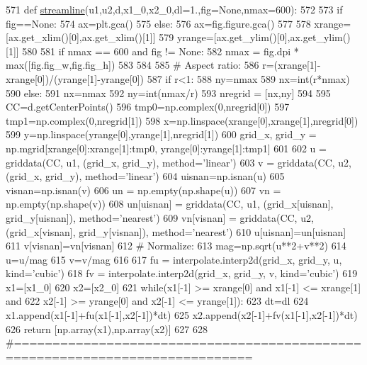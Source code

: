 \begin{DoxyCode}
571 \textcolor{keyword}{def }\hyperlink{namespaceamrplot_a214eccffe1d56a25d80925cc453f5a23}{streamline}(u1,u2,d,x1\_0,x2\_0,dl=1.,fig=None,nmax=600):
572 
573     \textcolor{keywordflow}{if} fig==\textcolor{keywordtype}{None}:
574         ax=plt.gca()
575     \textcolor{keywordflow}{else}:
576         ax=fig.figure.gca()
577 
578     xrange=[ax.get\_xlim()[0],ax.get\_xlim()[1]]
579     yrange=[ax.get\_ylim()[0],ax.get\_ylim()[1]]
580 
581     \textcolor{keywordflow}{if} nmax == 600 \textcolor{keywordflow}{and} fig != \textcolor{keywordtype}{None}:
582         nmax = fig.dpi * max([fig.fig\_w,fig.fig\_h])
583 
584 
585     \textcolor{comment}{# Aspect ratio:}
586     r=(xrange[1]-xrange[0])/(yrange[1]-yrange[0])
587     \textcolor{keywordflow}{if} r<1:
588         ny=nmax
589         nx=int(r*nmax)
590     \textcolor{keywordflow}{else}:
591         nx=nmax
592         ny=int(nmax/r)
593     nregrid = [nx,ny]
594 
595     CC=d.getCenterPoints()
596     tmp0=np.complex(0,nregrid[0])
597     tmp1=np.complex(0,nregrid[1])
598     x=np.linspace(xrange[0],xrange[1],nregrid[0])
599     y=np.linspace(yrange[0],yrange[1],nregrid[1])
600     grid\_x, grid\_y = np.mgrid[xrange[0]:xrange[1]:tmp0, yrange[0]:yrange[1]:tmp1]
601 
602     u = griddata(CC, u1, (grid\_x, grid\_y), method=\textcolor{stringliteral}{'linear'})
603     v = griddata(CC, u2, (grid\_x, grid\_y), method=\textcolor{stringliteral}{'linear'})
604     uisnan=np.isnan(u)
605     visnan=np.isnan(v)
606     un = np.empty(np.shape(u))
607     vn = np.empty(np.shape(v))
608     un[uisnan] = griddata(CC, u1, (grid\_x[uisnan], grid\_y[uisnan]), method=\textcolor{stringliteral}{'nearest'})
609     vn[visnan] = griddata(CC, u2, (grid\_x[visnan], grid\_y[visnan]), method=\textcolor{stringliteral}{'nearest'})
610     u[uisnan]=un[uisnan]
611     v[visnan]=vn[visnan]
612 \textcolor{comment}{# Normalize:}
613     mag=np.sqrt(u**2+v**2)
614     u=u/mag
615     v=v/mag
616 
617     fu = interpolate.interp2d(grid\_x, grid\_y, u, kind=\textcolor{stringliteral}{'cubic'})
618     fv = interpolate.interp2d(grid\_x, grid\_y, v, kind=\textcolor{stringliteral}{'cubic'})
619     x1=[x1\_0]
620     x2=[x2\_0]
621     while(x1[-1] >= xrange[0] \textcolor{keywordflow}{and} x1[-1] <= xrange[1] \textcolor{keywordflow}{and}
622     x2[-1] >= yrange[0] \textcolor{keywordflow}{and} x2[-1] <= yrange[1]):
623         dt=dl
624         x1.append(x1[-1]+fu(x1[-1],x2[-1])*dt)
625         x2.append(x2[-1]+fv(x1[-1],x2[-1])*dt)
626     \textcolor{keywordflow}{return} [np.array(x1),np.array(x2)]
627 
628 \textcolor{comment}{#=============================================================================}
\end{DoxyCode}
\mbox{\label{namespaceamrplot_afd42022e288c73e942784cf1207fa538}} 
